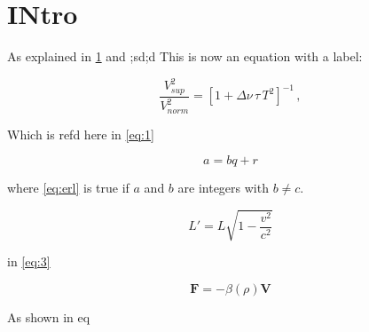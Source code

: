 \section{INtro}\label{sec:1}

As explained in \ref{sec:1} and ;sd;d
This is now an equation with a label:

\begin{equation}
\label{eq:1}
\frac{V_{ sup}^2}{V_{ norm}^2} = [1 + \Delta \nu \, \tau \, T^2 ]^{-1} \, ,
\end{equation}

Which is refd here in \ref{eq:1}

\begin{equation} \label{eq:erl}
a = bq + r
\end{equation}

where \eqref{eq:erl} is true if $a$ and $b$ are integers with $b \neq c$.

\begin{equation}
\label{eq:3}
  L' = {L}{\sqrt{1-\frac{v^2}{c^2}}}
 \end{equation}

in \ref{eq:3}

\begin{equation}
\mathbf{F} = -\beta(\rho) \mathbf{V}
\label{eq:linearbeta}
\end{equation}

As shown in eq

